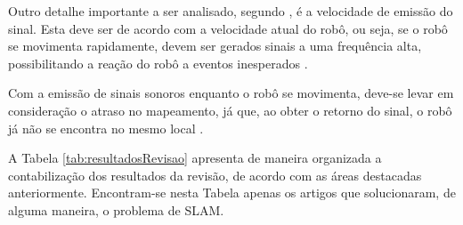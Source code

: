 			Outro detalhe importante a ser analisado, segundo \cite{agenteExploratorioKalman}, é a velocidade de emissão do sinal. Esta deve ser de acordo com a velocidade atual do robô, ou seja, se o robô se movimenta rapidamente, devem ser gerados sinais a uma frequência alta, possibilitando a reação do robô a eventos inesperados \cite{agenteExploratorioKalman}.

			Com a emissão de sinais sonoros enquanto o robô se movimenta, deve-se levar em consideração o atraso no mapeamento, já que, ao obter o retorno do sinal, o robô já não se encontra no mesmo local \cite{agenteExploratorioKalman}.


	A Tabela \ref{tab:resultadosRevisao} apresenta de maneira organizada a contabilização dos resultados da revisão, de acordo com as áreas destacadas anteriormente. Encontram-se nesta Tabela apenas os artigos que solucionaram, de alguma maneira, o problema de SLAM.

